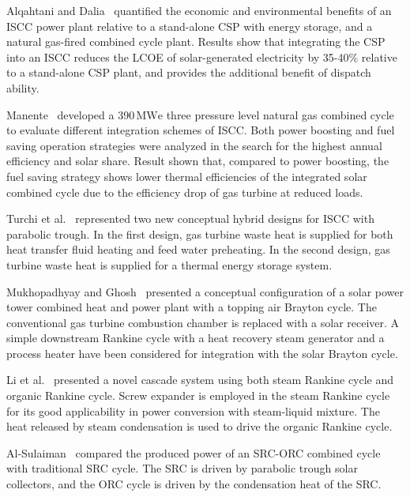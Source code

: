 Alqahtani and Dalia~\cite{Alqahtani2016} quantified the economic and environmental benefits of an ISCC power plant relative to a stand-alone CSP with energy storage, and a natural gas-fired combined cycle plant. Results show that integrating the CSP into an ISCC reduces the LCOE of solar-generated electricity by 35-40\% relative to a stand-alone CSP plant, and provides the additional benefit of dispatch ability.

Manente~\cite{Manente2016} developed a 390$\,\mathrm{MWe}$ three pressure level natural gas combined cycle to evaluate different integration schemes of ISCC. Both power boosting and fuel saving operation strategies were analyzed in the search for the highest annual efficiency and solar share. Result shown that, compared to power boosting, the fuel saving strategy shows lower thermal efficiencies of the integrated solar combined cycle due to the efficiency drop of gas turbine at reduced loads.

Turchi et al.~\cite{Turchi2014} represented two new conceptual hybrid designs for ISCC with parabolic trough. In the first design, gas turbine waste heat is supplied for both heat transfer fluid heating and feed water preheating. In the second design, gas turbine waste heat is supplied for a thermal energy storage system.

Mukhopadhyay and Ghosh~\cite{Mukhopadhyay2016} presented a conceptual configuration of a solar power tower combined heat and power plant with a topping air Brayton cycle. The conventional gas turbine combustion chamber is replaced with a solar receiver. A simple downstream Rankine cycle with a heat recovery steam generator and a process heater have been considered for integration with the solar Brayton cycle.

Li et al.~\cite{Li2016a} presented a novel cascade system using both steam Rankine cycle and organic Rankine cycle. Screw expander is employed in the steam Rankine cycle for its good applicability in power conversion with steam-liquid mixture. The heat released by steam condensation is used to drive the organic Rankine cycle.

Al-Sulaiman~\cite{AlSulaiman2014} compared the produced power of an SRC-ORC combined cycle with traditional SRC cycle. The SRC is driven by parabolic trough solar collectors, and the ORC cycle is driven by the condensation heat of the SRC.

